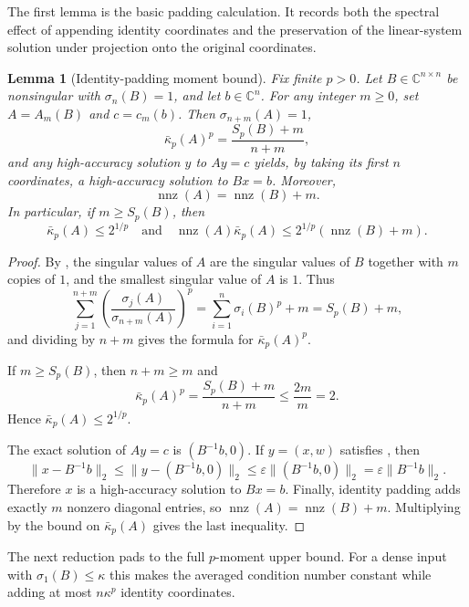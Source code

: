 \documentclass[11pt]{article}
\newtheorem{lemma}{Lemma}[section]
\begin{document}
The first lemma is the basic padding calculation.  It records both the
spectral effect of appending identity coordinates and the preservation of the
linear-system solution under projection onto the original coordinates.

\begin{lemma}[Identity-padding moment bound]
\label{lem:padding-moment-bound}
Fix finite $p>0$.  Let $B\in\mathbb{C}^{n\times n}$ be nonsingular with
$\sigma_n(B)=1$, and let $b\in\mathbb{C}^n$.  For any integer $m\geq 0$, set
$A=A_m(B)$ and $c=c_m(b)$.  Then $\sigma_{n+m}(A)=1$,
\[
  \bar{\kappa}_p(A)^p=\frac{S_p(B)+m}{n+m},
\]
and any high-accuracy solution $y$ to $Ay=c$ yields, by taking its first $n$
coordinates, a high-accuracy solution to $Bx=b$.  Moreover,
\[
  \operatorname{nnz}(A)=\operatorname{nnz}(B)+m.
\]
In particular, if $m\geq S_p(B)$, then
\[
  \bar{\kappa}_p(A)\leq 2^{1/p}
  \quad\text{and}\quad
  \operatorname{nnz}(A)\bar{\kappa}_p(A)
  \leq 2^{1/p}\left(\operatorname{nnz}(B)+m\right).
\]
\end{lemma}

\begin{proof}
By , the singular values of $A$ are
the singular values of $B$ together with $m$ copies of $1$, and the smallest
singular value of $A$ is $1$.  Thus
\[
  \sum_{j=1}^{n+m}
  \left(\frac{\sigma_j(A)}{\sigma_{n+m}(A)}\right)^p
  =
  \sum_{i=1}^n \sigma_i(B)^p+m
  =
  S_p(B)+m,
\]
and dividing by $n+m$ gives the formula for $\bar{\kappa}_p(A)^p$.

If $m\geq S_p(B)$, then $n+m\geq m$ and
\[
  \bar{\kappa}_p(A)^p
  =
  \frac{S_p(B)+m}{n+m}
  \leq
  \frac{2m}{m}
  =
  2.
\]
Hence $\bar{\kappa}_p(A)\leq 2^{1/p}$.

The exact solution of $Ay=c$ is $(B^{-1}b,0)$.  If $y=(x,w)$ satisfies
, then
\[
  \|x-B^{-1}b\|_2
  \leq
  \|y-(B^{-1}b,0)\|_2
  \leq
  \varepsilon\|(B^{-1}b,0)\|_2
  =
  \varepsilon\|B^{-1}b\|_2.
\]
Therefore $x$ is a high-accuracy solution to $Bx=b$.  Finally, identity
padding adds exactly $m$ nonzero diagonal entries, so
$\operatorname{nnz}(A)=\operatorname{nnz}(B)+m$.  Multiplying by the bound on
$\bar{\kappa}_p(A)$ gives the last inequality.
\end{proof}

The next reduction pads to the full $p$-moment upper bound.  For a dense input
with $\sigma_1(B)\leq\kappa$ this makes the averaged condition number constant
while adding at most $n\kappa^p$ identity coordinates.
\end{document}
